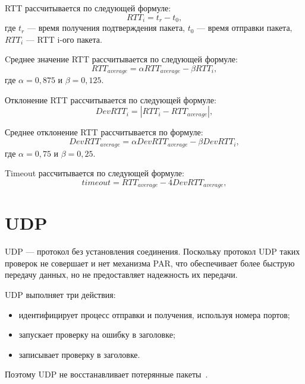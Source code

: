 RTT рассчитывается по следующей формуле:
\begin{equation*}
	\label{formula:rtt}
	RTT_i = t_{r} - t_{0},
\end{equation*}
где $t_{r}$ --- время получения подтверждения пакета, $t_{0}$ --- время отправки пакета, $RTT_i$ --- RTT i-ого пакета.

Cреднее значение RTT рассчитывается по следующей формуле:
\begin{equation*}
	\label{formula:avg_rtt}
	RTT_{average} = \alpha RTT_{average} - \beta RTT_{i},
\end{equation*}
где $\alpha = 0,875$  и $\beta = 0,125$.

Отклонение RTT рассчитывается по следующей формуле:
\begin{equation*}
	\label{formula:dev_rtt}
	DevRTT_{i} = |RTT_{i} - RTT_{average}|,
\end{equation*}

Среднее отклонение RTT рассчитывается по формуле: 
\begin{equation*}
	\label{formula:avg_dev_rtt}
	DevRTT_{average} = \alpha DevRTT_{average} - \beta DevRTT_{i},
\end{equation*}
где $\alpha = 0,75$  и $\beta = 0,25$.

Timeout рассчитывается по следующей формуле:
\begin{equation*}
	\label{formula:timeout}
	timeout = RTT_{average} - 4DevRTT_{average},
\end{equation*}

\section{UDP}

UDP --- протокол без установления соединения.
Поскольку протокол UDP таких проверок не совершает и нет механизма PAR, что обеспечивает более быструю передачу данных, но не предоставляет надежность их передачи.

\clearpage

UDP выполняет три действия:
\begin{itemize}
	\item идентифицирует процесс отправки и получения, используя номера портов;
	\item запускает проверку на ошибку в заголовке;
	\item записывает проверку в заголовке.
\end{itemize}
Поэтому UDP не восстанавливает потерянные пакеты~\cite{tcp_ip_reilly, tcp_ip_lora, protocls_lakin}. 

